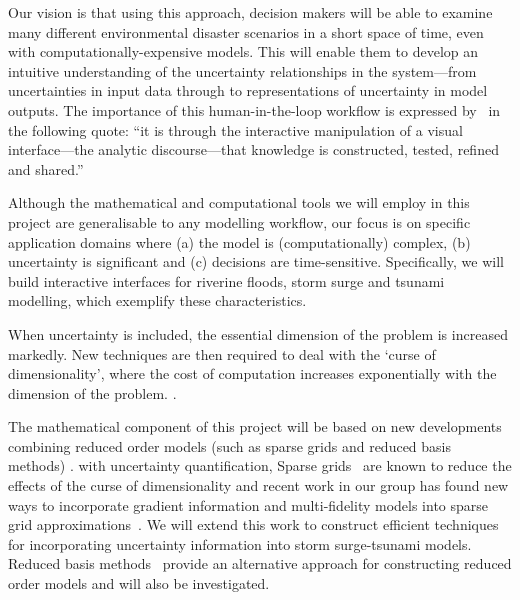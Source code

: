 Our vision is that using this approach, decision makers will be able
to examine many different environmental disaster scenarios in a short
space of time, even with computationally-expensive models. This will
enable them to develop an intuitive understanding of the uncertainty
relationships in the system---from uncertainties in input data through
to representations of uncertainty in model outputs. The importance of
this human-in-the-loop workflow is expressed by~\cite{pikeScience2009}
in the following quote: ``it is through the interactive manipulation
of a visual interface---the analytic discourse---that knowledge is
constructed, tested, refined and shared.''

Although the mathematical and computational tools we will employ in
this project are generalisable to any modelling workflow, our focus is
on specific application domains where (a) the model is
(computationally) complex, (b) uncertainty is significant and (c)
decisions are time-sensitive. Specifically, we will build interactive
interfaces for riverine floods, storm surge and tsunami modelling,
which exemplify these characteristics.

When uncertainty is included, the 
essential dimension of the problem is increased markedly.  
New techniques are then required to deal with the
`curse of dimensionality', where
the cost of computation increases exponentially with the dimension of
the problem. . 

The mathematical component of this project will be based on new
developments combining reduced order models 
(such as sparse grids and reduced basis methods) . 
with uncertainty quantification, 
Sparse grids~\parencite{BungartzGriebel2004} are known to
reduce the effects of the curse of dimensionality and 
recent work in our group has found new ways to incorporate gradient
information and multi-fidelity models into sparse grid
approximations~\parencite{deBaarHarding2015,Jakeman2015,deBaarRDM2015}.
We will extend this work to construct efficient techniques 
for incorporating uncertainty information into 
storm surge-tsunami models. 
Reduced basis 
methods~\parencite{quarteroni2015reduced} provide an 
alternative approach for constructing reduced order 
models and will also be investigated.

